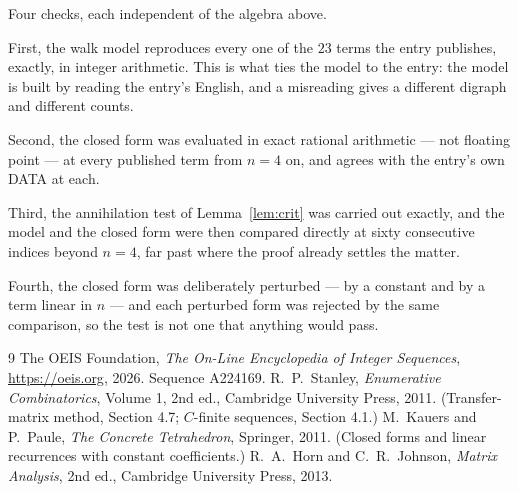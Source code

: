 \documentclass[11pt,a4paper]{article}
\theoremstyle{plain}
\theoremstyle{definition}
\begin{document}
Four checks, each independent of the algebra above.

First, the walk model reproduces every one of the $23$ terms the entry publishes,
exactly, in integer arithmetic. This is what ties the model to the entry: the model is built
by reading the entry's English, and a misreading gives a different digraph and different
counts.

Second, the closed form was evaluated in exact rational arithmetic --- not floating point ---
at every published term from $n=4$ on, and agrees with the entry's own DATA at each.

Third, the annihilation test of Lemma~\ref{lem:crit} was carried out exactly, and the model
and the closed form were then compared directly at sixty consecutive indices beyond
$n=4$, far past where the proof already settles the matter.

Fourth, the closed form was deliberately perturbed --- by a constant and by a term linear in
$n$ --- and each perturbed form was rejected by the same comparison, so the test is not one
that anything would pass.

\begin{thebibliography}{9}
 The OEIS Foundation, \emph{The On-Line Encyclopedia of Integer
Sequences}, \url{https://oeis.org}, 2026. Sequence A224169.
 R.~P.~Stanley, \emph{Enumerative Combinatorics}, Volume 1, 2nd ed.,
Cambridge University Press, 2011. (Transfer-matrix method, Section 4.7; $C$-finite sequences,
Section 4.1.)
 M.~Kauers and P.~Paule, \emph{The Concrete Tetrahedron}, Springer, 2011.
(Closed forms and linear recurrences with constant coefficients.)
 R.~A.~Horn and C.~R.~Johnson, \emph{Matrix Analysis}, 2nd ed., Cambridge
University Press, 2013.
\end{thebibliography}
\end{document}
